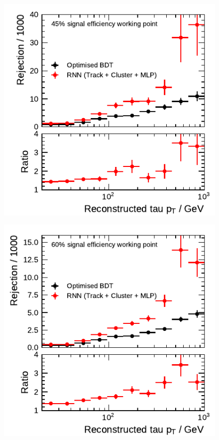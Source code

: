 \noindent
\begin{minipage}{\textwidth}
  \captionsetup{type=figure}
  \begin{subfigure}[t]{0.48\textwidth}
    \centering
    \includegraphics{./figures/rnn/combined/highpt/rnn_tight_3p.pdf}
  \end{subfigure}\hfill
  \begin{subfigure}[t]{0.48\textwidth}
    \centering
    \includegraphics{./figures/rnn/combined/highpt/rnn_medium_3p.pdf}

\end{subfigure}
\end{minipage}
